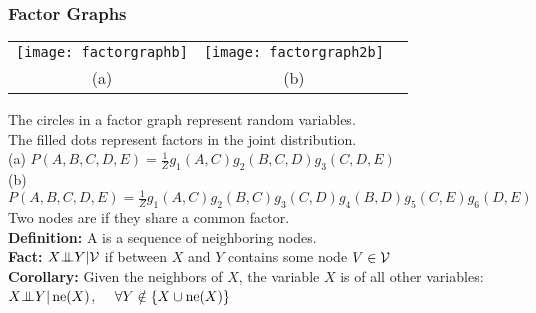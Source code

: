 \begin{frame}
\frametitle{Factor Graphs}
\vspace{-3ex}
\begin{center}
\begin{tabular}{ccc}
\texttt{[image: factorgraphb]} & \hspace{2em}
\texttt{[image: factorgraph2b]}\\
(a)  &  (b) 
\end{tabular}
\end{center}
\vspace{-0.3ex}

The circles in a factor graph represent random variables. \\
The filled dots represent factors in the joint distribution. \\

\hspace{1em} 
(a) $P(A,B,C,D,E) = \frac{1}{Z} g_1(A,C) g_2(B,C,D) g_3(C,D,E) $ \\[1ex]
\hspace*{1em} 
(b) $P(A,B,C,D,E) = \frac{1}{Z} g_1(A,C) g_2(B,C) g_3(C,D) g_4(B,D)
g_5(C,E) g_6(D,E)$\\

Two nodes are  if they share a common factor. \\

{\bf Definition:} A  is a sequence of neighboring nodes.\\

{\bf Fact:} $X {\bot\negthickspace\negthickspace\bot} Y | {\cal V}$ if  between $X$ and $Y$
contains some node $V \in {\cal V}$ \\

{\bf Corollary:} Given the neighbors of $X$, the variable $X$ is  of all other variables: $X {\bot\negthickspace\negthickspace\bot} Y | \operatorname{ne}(X)$, \ \ $\forall Y \notin
\{X \cup \operatorname{ne}(X)\}$


\end{frame}
